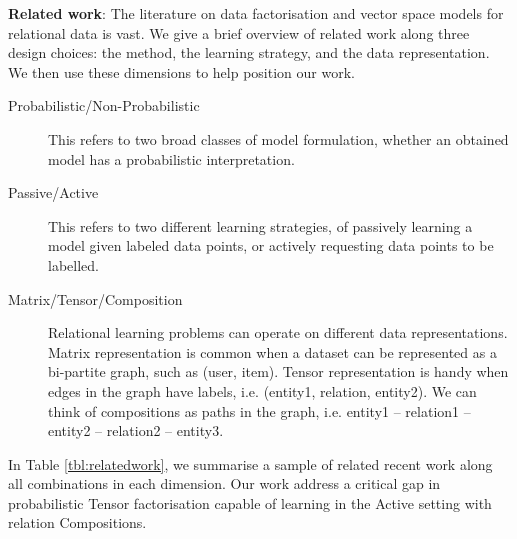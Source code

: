 
\textbf{Related work}:
The literature on data factorisation and vector space models for 
relational data is vast. 
We give a brief overview of related work along three design choices:
the method, the learning strategy, and the data representation. 
We then use these dimensions to help position our work. 
\begin{description}
\item[Probabilistic/Non-Probabilistic] This refers to two broad classes of model 
formulation, whether an obtained model has a probabilistic interpretation. 
\item[Passive/Active] This refers to two different learning strategies, 
of passively learning a model given labeled data points, or actively 
requesting data points to be labelled.
\item[Matrix/Tensor/Composition] Relational learning problems can operate on 
different data representations. Matrix representation is common when a dataset 
can be represented as a bi-partite graph, such as (user, item). 
Tensor representation is handy when edges in the 
graph have labels, i.e. (entity1, relation, entity2). We can think of 
compositions as paths in the graph, i.e. entity1 -- relation1 -- entity2 -- 
relation2 -- entity3.
\end{description}
In Table \ref{tbl:relatedwork}, we summarise a sample of related recent work 
along all combinations in each dimension. 
Our work address a critical gap 
in probabilistic Tensor factorisation capable of learning in the 
Active setting with relation Compositions.

